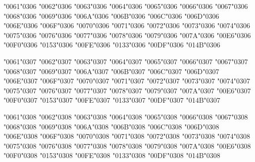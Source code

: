 \textsc{\char"0061\char"0306} \textsc{\char"0062\char"0306} \textsc{\char"0063\char"0306} \textsc{\char"0064\char"0306} \textsc{\char"0065\char"0306} \textsc{\char"0066\char"0306} \textsc{\char"0067\char"0306} \textsc{\char"0068\char"0306} \textsc{\char"0069\char"0306} \textsc{\char"006A\char"0306} \textsc{\char"006B\char"0306} \textsc{\char"006C\char"0306} \textsc{\char"006D\char"0306} \textsc{\char"006E\char"0306} \textsc{\char"006F\char"0306} \textsc{\char"0070\char"0306} \textsc{\char"0071\char"0306} \textsc{\char"0072\char"0306} \textsc{\char"0073\char"0306} \textsc{\char"0074\char"0306} \textsc{\char"0075\char"0306} \textsc{\char"0076\char"0306} \textsc{\char"0077\char"0306} \textsc{\char"0078\char"0306} \textsc{\char"0079\char"0306} \textsc{\char"007A\char"0306} \textsc{\char"00E6\char"0306} \textsc{\char"00F0\char"0306} \textsc{\char"0153\char"0306} \textsc{\char"00FE\char"0306} \textsc{\char"0133\char"0306} \textsc{\char"00DF\char"0306} \textsc{\char"014B\char"0306}

\textsc{\char"0061\char"0307} \textsc{\char"0062\char"0307} \textsc{\char"0063\char"0307} \textsc{\char"0064\char"0307} \textsc{\char"0065\char"0307} \textsc{\char"0066\char"0307} \textsc{\char"0067\char"0307} \textsc{\char"0068\char"0307} \textsc{\char"0069\char"0307} \textsc{\char"006A\char"0307} \textsc{\char"006B\char"0307} \textsc{\char"006C\char"0307} \textsc{\char"006D\char"0307} \textsc{\char"006E\char"0307} \textsc{\char"006F\char"0307} \textsc{\char"0070\char"0307} \textsc{\char"0071\char"0307} \textsc{\char"0072\char"0307} \textsc{\char"0073\char"0307} \textsc{\char"0074\char"0307} \textsc{\char"0075\char"0307} \textsc{\char"0076\char"0307} \textsc{\char"0077\char"0307} \textsc{\char"0078\char"0307} \textsc{\char"0079\char"0307} \textsc{\char"007A\char"0307} \textsc{\char"00E6\char"0307} \textsc{\char"00F0\char"0307} \textsc{\char"0153\char"0307} \textsc{\char"00FE\char"0307} \textsc{\char"0133\char"0307} \textsc{\char"00DF\char"0307} \textsc{\char"014B\char"0307}

\textsc{\char"0061\char"0308} \textsc{\char"0062\char"0308} \textsc{\char"0063\char"0308} \textsc{\char"0064\char"0308} \textsc{\char"0065\char"0308} \textsc{\char"0066\char"0308} \textsc{\char"0067\char"0308} \textsc{\char"0068\char"0308} \textsc{\char"0069\char"0308} \textsc{\char"006A\char"0308} \textsc{\char"006B\char"0308} \textsc{\char"006C\char"0308} \textsc{\char"006D\char"0308} \textsc{\char"006E\char"0308} \textsc{\char"006F\char"0308} \textsc{\char"0070\char"0308} \textsc{\char"0071\char"0308} \textsc{\char"0072\char"0308} \textsc{\char"0073\char"0308} \textsc{\char"0074\char"0308} \textsc{\char"0075\char"0308} \textsc{\char"0076\char"0308} \textsc{\char"0077\char"0308} \textsc{\char"0078\char"0308} \textsc{\char"0079\char"0308} \textsc{\char"007A\char"0308} \textsc{\char"00E6\char"0308} \textsc{\char"00F0\char"0308} \textsc{\char"0153\char"0308} \textsc{\char"00FE\char"0308} \textsc{\char"0133\char"0308} \textsc{\char"00DF\char"0308} \textsc{\char"014B\char"0308}

